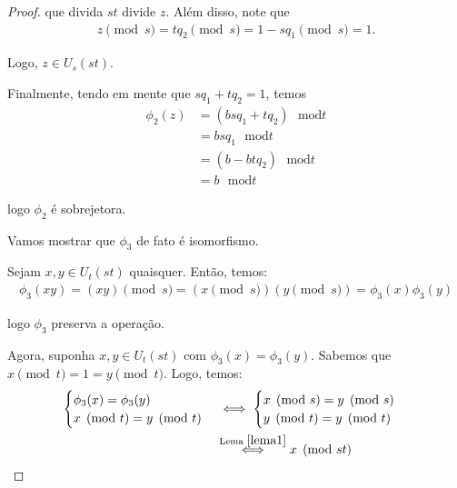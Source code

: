 \begin{proof}
		que divida $st$ divide $z$. Além disso, note que 
		\begin{align*}
		    z \pmod s 
		    = tq_2 \pmod s 
		    = 1 - sq_1 \pmod s = 1.
		\end{align*} 
		\par\vspace{0.3cm} Logo, $z\in U_s(st)$. 
		\par\vspace{0.3cm} Finalmente, tendo em mente que 
		$sq_1 + tq_2 = 1$, temos
		\begin{align*}
		\phi_2(z) 
		&= (bsq_1 + tq_2)\text{ }\mathrm{mod} t \\ 
		&= bsq_1\text{ }\mathrm{mod} t \\ 
		&= (b - btq_2)\text{ }\mathrm{mod} t \\ 
		&= b\text{ }\mathrm{mod} t
		\end{align*}
		\par\vspace{0.3cm}logo $\phi_2$ é sobrejetora.
		\vspace{0.3cm}\par Vamos mostrar que $\phi_3$ de fato é isomorfismo.
		\par\vspace{0.3cm} Sejam $x,y\in U_t(st)$ quaisquer. Então, temos:
		\begin{align*}
		    \phi_3(xy) 
		    = (xy)\pmod s 
		    = (x\pmod s)(y\pmod s) 
		    = \phi_3(x)\phi_3(y)
		\end{align*}
		\par\vspace{0.3cm} logo $\phi_3$ preserva a operação.
		\par\vspace{0.3cm} Agora, suponha $x,y\in U_t(st)$ com 
		$\phi_3(x) = \phi_3(y)$. Sabemos que 
		$x\pmod t = 1 = y\pmod t$.
		Logo, temos:
		\begin{align*}
            \begin{cases}
                \phi_3(x) = \phi_3(y) \\
                x\pmod t = y\pmod t
            \end{cases}
            &\iff
            \begin{cases}
                x\pmod s = y\pmod s \\
                y\pmod t = y\pmod t
            \end{cases} \\
            &\overset{\text{Lema }\ref{lema1}}{\iff}x\pmod {st} 

\end{align*}
\end{proof}
